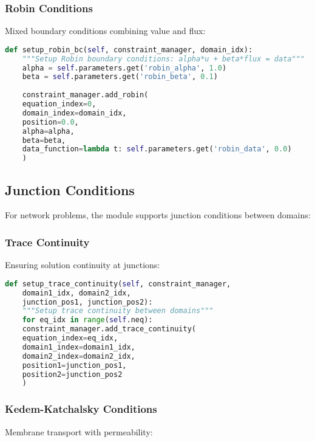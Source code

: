 \subsubsection{Robin Conditions}

Mixed boundary conditions combining value and flux:

\begin{lstlisting}[language=Python, caption=Robin Boundary Conditions]
	def setup_robin_bc(self, constraint_manager, domain_idx):
	"""Setup Robin boundary conditions: alpha*u + beta*flux = data"""
	alpha = self.parameters.get('robin_alpha', 1.0)
	beta = self.parameters.get('robin_beta', 0.1)
	
	constraint_manager.add_robin(
	equation_index=0,
	domain_index=domain_idx,
	position=0.0,
	alpha=alpha,
	beta=beta,
	data_function=lambda t: self.parameters.get('robin_data', 0.0)
	)
\end{lstlisting}

\subsection{Junction Conditions}
\label{subsec:junction_conditions}

For network problems, the module supports junction conditions between domains:

\subsubsection{Trace Continuity}

Ensuring solution continuity at junctions:

\begin{lstlisting}[language=Python, caption=Trace Continuity Conditions]
	def setup_trace_continuity(self, constraint_manager, 
	domain1_idx, domain2_idx,
	junction_pos1, junction_pos2):
	"""Setup trace continuity between domains"""
	for eq_idx in range(self.neq):
	constraint_manager.add_trace_continuity(
	equation_index=eq_idx,
	domain1_index=domain1_idx,
	domain2_index=domain2_idx,
	position1=junction_pos1,
	position2=junction_pos2
	)
\end{lstlisting}

\subsubsection{Kedem-Katchalsky Conditions}

Membrane transport with permeability:


